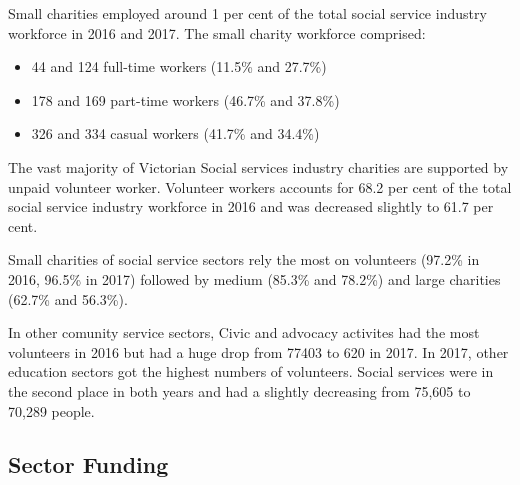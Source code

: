 \documentclass[
  11pt,
]{article}
\providecommand{\tightlist}{%
  \setlength{\itemsep}{0pt}\setlength{\parskip}{0pt}}
\begin{document}
Small charities employed around 1 per cent of the total social service industry workforce in 2016 and 2017. The small charity workforce comprised:

\begin{itemize}
\tightlist
\item
  44 and 124 full-time workers (11.5\% and 27.7\%)
\item
  178 and 169 part-time workers (46.7\% and 37.8\%)
\item
  326 and 334 casual workers (41.7\% and 34.4\%)
\end{itemize}

The vast majority of Victorian Social services industry charities are supported by unpaid volunteer worker. Volunteer workers accounts for 68.2 per cent of the total social service industry workforce in 2016 and was decreased slightly to 61.7 per cent.

Small charities of social service sectors rely the most on volunteers (97.2\% in 2016, 96.5\% in 2017) followed by medium (85.3\% and 78.2\%) and large charities (62.7\% and 56.3\%).

In other comunity service sectors, Civic and advocacy activites had the most volunteers in 2016 but had a huge drop from 77403 to 620 in 2017. In 2017, other education sectors got the highest numbers of volunteers. Social services were in the second place in both years and had a slightly decreasing from 75,605 to 70,289 people.

\hypertarget{sector-funding}{%
\subsection{Sector Funding}\label{sector-funding}}
\end{document}
